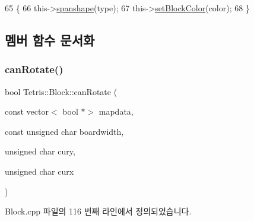 \begin{DoxyCode}
65                                               \{
66                 this->\hyperlink{class_tetris_1_1_block_ad683f161157c16b80d5df8929bca468c}{spanshape}(type);
67                 this->\hyperlink{class_tetris_1_1_block_a1a3fab9e7eabe64a4ba588ed5091d3a9}{setBlockColor}(color);
68             \}
\end{DoxyCode}


\subsection{멤버 함수 문서화}
\mbox{\label{class_tetris_1_1_block_a56d194d0a5d56d2d1220ec32774cea38}} 
\subsubsection{\texorpdfstring{can\+Rotate()}{canRotate()}\hspace{0.1cm}{\footnotesize\ttfamily [1/2]}}
{\footnotesize\ttfamily bool Tetris\+::\+Block\+::can\+Rotate (\begin{DoxyParamCaption}\item[{const vector$<$ bool $\ast$$>$}]{mapdata,  }\item[{const unsigned char}]{boardwidth,  }\item[{unsigned char}]{cury,  }\item[{unsigned char}]{curx }\end{DoxyParamCaption})}



Block.\+cpp 파일의 116 번째 라인에서 정의되었습니다.


